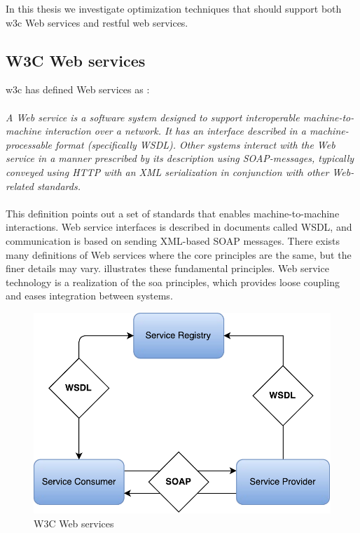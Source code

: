 In this thesis we investigate optimization techniques that should support both
\gls{w3c} Web services and \gls{rest}ful web services.

\subsection{W3C Web services}

\gls{w3c} has defined Web services as \cite{wrc-web-service}:

\paragraph{}
\textit{
    A Web service is a software system designed to support interoperable
    machine-to-machine interaction over a network. It has an interface described in
    a machine-processable format (specifically WSDL). Other systems interact with
    the Web service in a manner prescribed by its description using SOAP-messages,
    typically conveyed using HTTP with an XML serialization in conjunction with
    other Web-related standards.
}

\paragraph{}

This definition points out a set of standards that enables machine-to-machine
interactions. Web service interfaces is described in documents called WSDL, and
communication is based on sending XML-based SOAP messages. There exists many
definitions of Web services where the core principles are the same, but the
finer details may vary.  illustrates these
fundamental principles. Web service technology is a realization of the \gls{soa}
principles, which provides loose coupling and eases integration between systems.

\begin{figure}[h]
\centering
\includegraphics[scale=0.6]{images/web_services.pdf}
\caption{W3C Web services}
\label{figure-w3c-web-services}
\end{figure}

